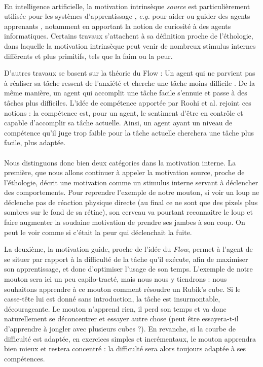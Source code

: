         
        \paragraph{}
        En intelligence artificielle, la motivation intrinsèque \textit{source} est particulièrement utilisée pour les systèmes d'apprentissage \cite{schmidhuber_formal_2010}, \textit{e.g.} pour aider ou guider des agents apprenants \cite{baldassarre_intrinsically_2013}, notamment en apportant la notion de curiosité à des agents informatiques. Certains travaux  \cite{carbonell_multi-agent_1994, maes_agent_1991} s'attachent à sa définition proche de l'éthologie, dans laquelle la motivation intrinsèque peut venir de nombreux stimulus internes différents et plus primitifs, tels que la faim ou la peur.
        
        D'autres travaux se basent sur la théorie du Flow : Un agent qui ne parvient pas à réaliser sa tâche ressent de l'anxiété et cherche une tâche moins difficile \cite{cornudella_how_2015}. De la même manière, un agent qui accomplit une tâche facile s'ennuie et passe à des tâches plus difficiles. L'idée de compétence apportée par Roohi et al.\cite{roohi_review_2018} rejoint ces notions : la compétence est, pour un agent, le sentiment d'être en contrôle et capable d'accomplir sa tâche actuelle. Ainsi, un agent ayant un niveau de compétence qu'il juge trop faible pour la tâche actuelle cherchera une tâche plus facile, plus adaptée.
        
        \paragraph{}
        Nous distinguons donc bien deux catégories dans la motivation interne. La première, que nous allons continuer à appeler la motivation source, proche de l'éthologie, décrit une motivation comme un stimulus interne servant à déclencher des comportements. Pour reprendre l'exemple de notre mouton, si voir un loup ne déclenche pas de réaction physique directe (au final ce ne sont que des pixels plus sombres sur le fond de sa rétine), son cerveau va pourtant reconnaitre le loup et faire augmenter la soudaine motivation de prendre ses jambes à son coup. On peut le voir comme si c'était la peur qui déclenchait la fuite.
        
        La deuxième, la motivation guide, proche de l'idée du \textit{Flow}, permet à l'agent de se situer par rapport à la difficulté de la tâche qu'il exécute, afin de maximiser son apprentissage, et donc d'optimiser l'usage de son temps. L'exemple de notre mouton sera ici un peu capilo-tracté, mais nous nous y tiendrons : nous souhaitons apprendre à ce mouton comment résoudre un Rubik's cube. Si le casse-tête lui est donné sans introduction, la tâche est insurmontable, décourageante. Le mouton n'apprend rien, il perd son temps et va donc naturellement se déconcentrer et essayer autre chose (peut être essayera-t-il d'apprendre à jongler avec plusieurs cubes ?). En revanche, si la courbe de difficulté est adaptée, en exercices simples et incrémentaux, le mouton apprendra bien mieux et restera concentré : la difficulté sera alors toujours adaptée à ses compétences.
        
